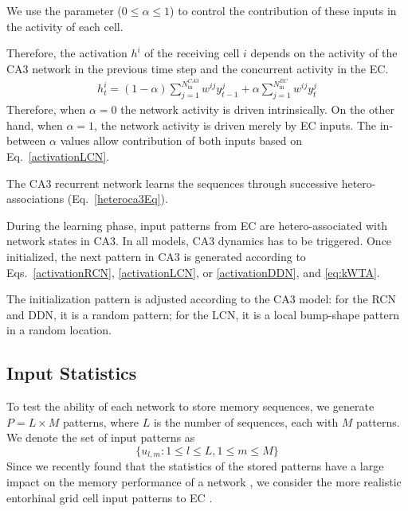 \documentclass[utf8]{frontiersSCNS} %
\begin{document}
\begin{enumerate}
We use the parameter ($0 \leq \alpha \leq 1$) to control the contribution of these inputs in the activity of each cell. 

Therefore, the activation $h^i$ of the receiving cell $i$ depends on the activity of the CA3 network in the previous time step and the concurrent activity in the EC.
\begin{align}
\label{activationDDN}
h^{i}_{t} = (1 - \alpha) \sum_{j = 1}^{N^{CA3}_\mathrm{in}} {{w^{ij} y^{j}_{t-1}}} + \alpha \sum_{j = 1}^{N^{EC}_\mathrm{in}} {{w^{ij} y^{j}_{t}}} 
\end{align}
Therefore, when $\alpha = 0$ the network activity is driven intrinsically. On the other hand, when $\alpha = 1$, the network activity is driven merely by EC inputs. The in-between $\alpha$ values allow contribution of both inputs based on Eq.~\ref{activationLCN}.        

The CA3 recurrent network learns the sequences through successive hetero-associations (Eq.~\ref{heteroca3Eq}).
\end{enumerate}

During the learning phase, input patterns from EC are hetero-associated with network states in CA3. In all models, CA3 dynamics has to be triggered. Once initialized, the next pattern in CA3 is generated according to Eqs.~\ref{activationRCN}, \ref{activationLCN}, or \ref{activationDDN}, and \ref{eq:kWTA}.

The initialization pattern is adjusted according to the CA3 model: for the RCN and DDN, it is a random pattern; for the LCN, it is a local bump-shape pattern in a random location.


\subsection{Input Statistics}

To test the ability of each network to store memory sequences, we generate $P = L \times M$ patterns, where $L$ is the number of sequences, each with $M$ patterns. We denote the set of input patterns as 
\begin{equation}
	\{ u_{l,m}: 1\le l \le L, 1\le m \le M \}
\end{equation}
Since we recently found that the statistics of the stored patterns have a large impact on the memory performance of a network \cite{neher2015memory}, we consider the more realistic entorhinal grid cell input patterns to EC \cite{hafting2005microstructure}. 
\end{document}

